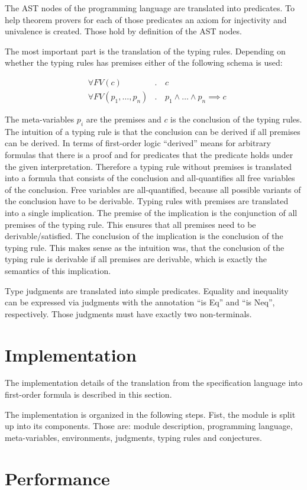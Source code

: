 The AST nodes of the programming language are translated into
predicates. To help theorem provers for each of those predicates an
axiom for injectivity and univalence is created. Those hold by
definition of the AST nodes.

The most important part is the translation of the typing
rules. Depending on whether the typing rules has premises either of
the following schema is used:

\begin{align}
  &\forall FV(c) &.\,& c \\
  &\forall FV(p_1,\dots, p_n) &.\,& p_1 \land \dots \land p_n \implies c
\end{align}

The meta-variables $p_i$ are the premises and $c$ is the conclusion of
the typing rules. The intuition of a typing rule is that the
conclusion can be derived if all premises can be derived. In terms of
first-order logic ``derived'' means for arbitrary formulas that there
is a proof and for predicates that the predicate holds under the given
interpretation. Therefore a typing rule without premises is translated
into a formula that consists of the conclusion and all-quantifies all
free variables of the conclusion. Free variables are all-quantified,
because all possible variants of the conclusion have to be derivable.
Typing rules with premises are translated into a single
implication. The premise of the implication is the conjunction of all
premises of the typing rule. This ensures that all premises need to be
derivable/satisfied. The conclusion of the implication is the
conclusion of the typing rule. This makes sense as the intuition was,
that the conclusion of the typing rule is derivable if all premises
are derivable, which is exactly the semantics of this implication.

Type judgments are translated into simple predicates. Equality and
inequality can be expressed via judgments with the annotation ``is
Eq'' and ``is Neq'', respectively. Those judgments must have exactly
two non-terminals.
\section{Implementation}
\label{sec:implementation-fof}
The implementation details of the translation from the specification
language into first-order formula is described in this section.

The implementation is organized in the following steps. Fist, the
module is split up into its components. Those are: module description,
programming language, meta-variables, environments, judgments, typing
rules and conjectures. 

\section{Performance}
